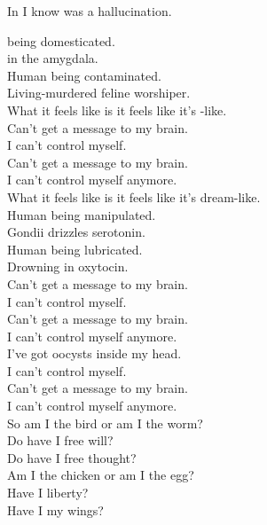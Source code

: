 In  I know  was a hallucination. \\




 being domesticated. \\
 in the amygdala. \\
Human being contaminated. \\
Living-murdered feline worshiper. \\

What it feels like is it feels like it's -like. \\

Can't get a message to my brain. \\
I can't control myself. \\
Can't get a message to my brain. \\
I can't control myself anymore. \\

What it feels like is it feels like it's dream-like. \\

Human being manipulated. \\
Gondii drizzles serotonin. \\
Human being lubricated. \\
Drowning in oxytocin. \\

Can't get a message to my brain. \\
I can't control myself. \\
Can't get a message to my brain. \\
I can't control myself anymore. \\
I've got oocysts inside my head. \\
I can't control myself. \\
Can't get a message to my brain. \\
I can't control myself anymore. \\

So am I the bird or am I the worm? \\
Do have I free will? \\
Do have I free thought? \\

Am I the chicken or am I the egg? \\
Have I liberty? \\
Have I my wings? \\

